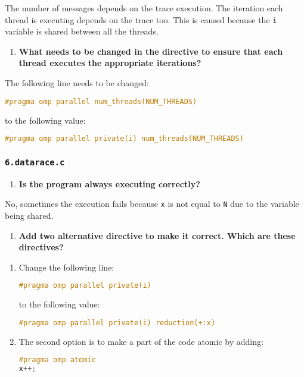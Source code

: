 \documentclass[a4paper]{article}
\begin{document}
The number of messages depends on the trace execution. The iteration each thread is executing depends on the trace too. This is caused because the \verb|i| variable is shared between all the threads.

\begin{enumerate}[resume]
	\item \textbf{What needs to be changed in the directive to ensure that each thread executes the appropriate iterations?}
\end{enumerate}

The following line needs to be changed:
\begin{lstlisting}[language=C]
#pragma omp parallel num_threads(NUM_THREADS)
\end{lstlisting}

to the following value:
\begin{lstlisting}[language=C]
#pragma omp parallel private(i) num_threads(NUM_THREADS)
\end{lstlisting}

\subsubsection{\texttt{6.datarace.c}}
\begin{enumerate}
	\item \textbf{Is the program always executing correctly?}
\end{enumerate}

No, sometimes the execution fails because \verb|x| is not equal to \verb|N| due to the variable being shared.

\begin{enumerate}[resume]
	\item \textbf{Add two alternative directive to make it correct. Which are these directives?}
\end{enumerate}

\begin{enumerate}[label=\roman*)]
	\item Change the following line:
	\begin{lstlisting}[language=C]
#pragma omp parallel private(i)
	\end{lstlisting}
	
	to the following value:
	\begin{lstlisting}[language=C]
#pragma omp parallel private(i) reduction(+:x)
	\end{lstlisting}
	
	\item The second option is to make a part of the code atomic by adding:
	\begin{lstlisting}[language=C]
#pragma omp atomic
x++;
	\end{lstlisting}
\end{enumerate}
\end{document}
